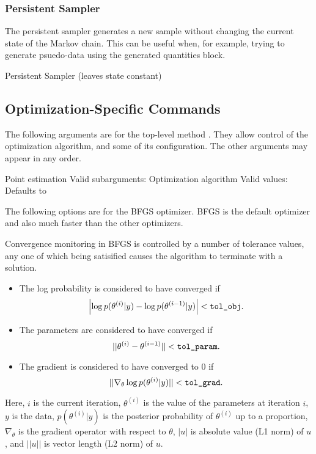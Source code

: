 \subsubsection{Persistent Sampler}

The persistent sampler generates a new sample without changing
the current state of the Markov chain.  This can be useful when,
for example, trying to generate psuedo-data using the generated
quantities block.
%
\begin{description}
        {Persistent Sampler (leaves state constant)}
\end{description}

\subsection{Optimization-Specific Commands}

The following arguments are for the top-level method .
They allow control of the optimization algorithm, and some of its
configuration.  The other arguments may appear in any order.

\begin{description}
%
    {Point estimation}
    {Valid subarguments: }
%
      {Optimization algorithm}
      {Valid values: \  }
      {Defaults to }
\end{description}
%
The following options are for the BFGS optimizer.  BFGS is the default
optimizer and also much faster than the other optimizers.  

Convergence monitoring in BFGS is controlled by a number of tolerance
values, any one of which being satisified causes the algorithm to
terminate with a solution.
%
\begin{itemize}
\item The log probability is considered to have converged if
\[
\left| \log p(\theta^{(i)}|y) - \log p(\theta^{(i-1)}|y) \right| <
\mbox{\code{tol\_obj}}.
\]
\item The parameters are considered to have converged if
%
\\
\[
|| \theta^{(i)} - \theta^{(i-1)} || < \mbox{\code{tol\_param}}.
\]
%
\item The gradient is considered to have converged to 0 if 
\[
|| \nabla_{\theta} \log p(\theta^{(i)}|y) || < \mbox{\code{tol\_grad}}.
\]
\end{itemize}
%
Here, $i$ is the current iteration, $\theta^{(i)}$ is the value of the
parameters at iteration $i$, $y$ is the data, $p(\theta^{(i)}|y)$ is
the posterior probability of $\theta^{(i)}$ up to a proportion,
$\nabla_{\theta}$ is the gradient operator with respect to $\theta$,
$|u|$ is absolute value (L1 norm) of $u$, and $||u||$ is vector length
(L2 norm) of $u$.

